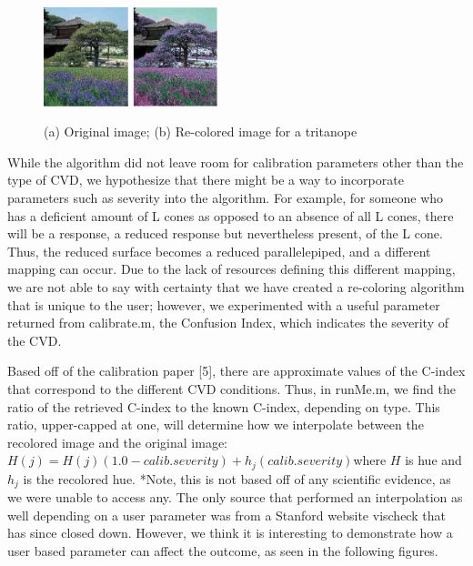 \documentclass[10pt,twocolumn,letterpaper]{article}
\begin{document}
\begin{figure}[h]
  \includegraphics[width=0.22\textwidth]{zen1.png}
  \includegraphics[width=0.22\textwidth]{zen2.png}
  \caption{(a) Original image; (b) Re-colored image for a tritanope}
  \label{fig:zen}
\end{figure}

While the algorithm did not leave room for calibration parameters other than the type of CVD, we hypothesize that there might be a way to incorporate parameters such as severity into the algorithm. For example, for someone who has a deficient amount of L cones as opposed to an absence of all L cones, there will be a response, a reduced response but nevertheless present, of the L cone. Thus, the reduced surface becomes a reduced parallelepiped, and a different mapping can occur. Due to the lack of resources defining this different mapping, we are not able to say with certainty that we have created a re-coloring algorithm that is unique to the user; however, we experimented with a useful parameter returned from calibrate.m, the Confusion Index, which indicates the severity of the CVD. 

Based off of the calibration paper [5], there are approximate values of the C-index that correspond to the different CVD conditions. Thus, in runMe.m, we find the ratio of the retrieved C-index to the known C-index, depending on type. This ratio, upper-capped at one, will determine how we interpolate between the recolored image and the original image: $H(j) = H(j)(1.0-calib.severity) + h_j(calib.severity)$where $H$ is hue and $h_j$ is the recolored hue. *Note, this is not based off of any scientific evidence, as we were unable to access any. The only source that performed an interpolation as well depending on a user parameter was from a Stanford website vischeck that has since closed down. However, we think it is interesting to demonstrate how a user based parameter can affect the outcome, as seen in the following figures. 
\end{document}
